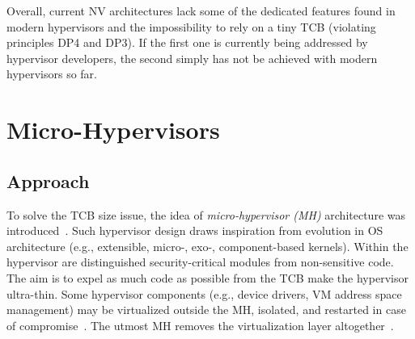 \documentclass{sig-alternate}
\begin{document}
Overall, current NV architectures lack some of the dedicated features found in modern hypervisors and the impossibility to rely on a tiny TCB (violating principles DP4 and DP3).
If the first one is currently being addressed by hypervisor developers, the second simply has not be achieved with modern hypervisors so far.

\section{Micro-Hypervisors}
\label{sec:mh}



\subsection{Approach}

\noindent To solve the TCB size issue, the idea of \textit{micro-hypervisor (MH)} architecture was introduced~\cite{nova, NoHype, xmhf}. Such hypervisor design draws inspiration from evolution in OS architecture (e.g., extensible, micro-, exo-, component-based kernels). Within the hypervisor are distinguished security-critical modules from non-sensitive code. The aim is to expel as much code as possible from the TCB make the hypervisor ultra-thin. Some hypervisor components (e.g., device drivers, VM address space management) may be virtualized outside the MH, isolated, and restarted in case of compromise~\cite{nova}. The utmost MH removes the virtualization layer altogether~\cite{NoHype}.
\end{document}
